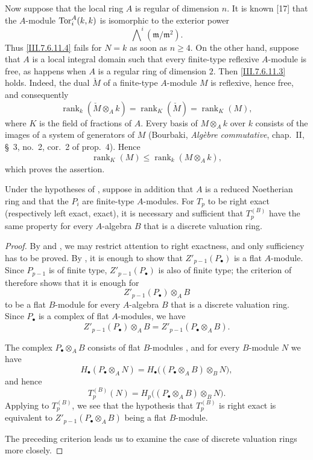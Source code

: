 {\begin{remarks}[7.6.11]
Now suppose that the local ring $A$ is regular of dimension
$n$.  It is known [17] that the $A$-module
$\operatorname{Tor}_i^A(k,k)$ is isomorphic to the exterior power
\[
  \bigwedge\nolimits^i(\mathfrak m/\mathfrak m^2).
\]
Thus \eqref{III.7.6.11.4} fails for $N=k$ as soon as
$n\geq4$.  On the other hand, suppose that $A$ is a local
integral domain such that every finite-type reflexive
$A$-module is free, as happens when $A$ is a regular ring of
dimension $2$.  Then \eqref{III.7.6.11.3} holds.  Indeed, the
dual $\check M$ of a finite-type $A$-module $M$ is reflexive,
hence free, and consequently
\[
  \operatorname{rank}_k(\check M\otimes_A k)
  =
  \operatorname{rank}_K(\check M)
  =
  \operatorname{rank}_K(M),
\]
where $K$ is the field of fractions of $A$.  Every basis of
$M\otimes_A k$ over $k$ consists of the images of a system of
generators of $M$ (Bourbaki, \emph{Alg\`ebre commutative},
chap.~II, \S~3, no.~2, cor.~2 of prop.~4).  Hence
\[
  \operatorname{rank}_K(M)
  \leq
  \operatorname{rank}_k(M\otimes_A k),
\]
which proves the assertion.
\end{remarks}
}

\begin{proposition}[7.6.2]
\label{III.7.6.2}
Under the hypotheses of , suppose in addition
that $A$ is a reduced Noetherian ring and that the $P_i$ are
finite-type $A$-modules.  For $T_p$ to be right exact
(respectively left exact, exact), it is necessary and
sufficient that $T_p^{(B)}$ have the same property for every
$A$-algebra $B$ that is a discrete valuation ring.
\end{proposition}

\begin{proof}
By  and , we may restrict
attention to right exactness, and only sufficiency has to be
proved.  By , it is enough to show that
$Z'_{p-1}(P_\bullet)$ is a flat $A$-module.  Since
$P_{p-1}$ is of finite type, $Z'_{p-1}(P_\bullet)$ is also of
finite type; the criterion of  therefore
shows that it is enough for
\[
  Z'_{p-1}(P_\bullet)\otimes_A B
\]
to be a flat $B$-module for every $A$-algebra $B$ that is a
discrete valuation ring.  Since $P_\bullet$ is a complex of
flat $A$-modules, we have
\[
  Z'_{p-1}(P_\bullet)\otimes_A B
  =
  Z'_{p-1}(P_\bullet\otimes_A B).
\]

The complex $P_\bullet\otimes_A B$ consists of flat
$B$-modules , and for every $B$-module $N$
we have
\[
  H_\bullet(P_\bullet\otimes_A N)
  =
  H_\bullet\bigl((P_\bullet\otimes_A B)\otimes_B N\bigr),
\]
and hence
\[
  T_p^{(B)}(N)
  =
  H_p\bigl((P_\bullet\otimes_A B)\otimes_B N\bigr).
\]
Applying  to $T_p^{(B)}$, we see that the
hypothesis that $T_p^{(B)}$ is right exact is equivalent to
$Z'_{p-1}(P_\bullet\otimes_A B)$ being a flat $B$-module.

The preceding criterion leads us to examine the case of
discrete valuation rings more closely.
\end{proof}

